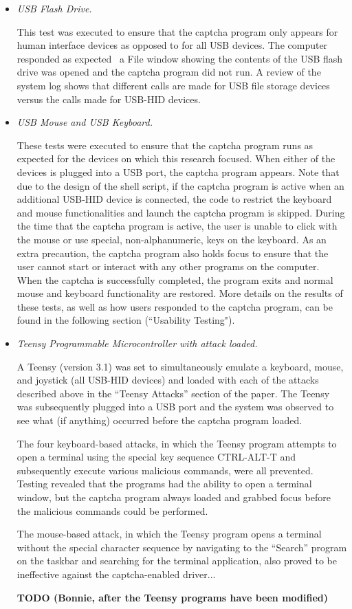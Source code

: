 \documentclass[pagenumbers]{ieee}
\begin{document}
\begin{itemize}
\item \textit{USB Flash Drive.}

This test was executed to ensure that the captcha program only appears for human interface devices as opposed to for all USB devices. The computer responded as expected \textemdash \ a File window showing the contents of the USB flash drive was opened and the captcha program did not run. A review of the system log shows that different calls are made for USB file storage devices versus the calls made for USB-HID devices.

\item \textit{USB Mouse and USB Keyboard.}

These tests were executed to ensure that the captcha program runs as expected for the devices on which this research focused. When either of the devices is plugged into a USB port, the captcha program appears. Note that due to the design of the shell script, if the captcha program is active when an additional USB-HID device is connected, the code to restrict the keyboard and mouse functionalities and launch the captcha program is skipped. During the time that the captcha program is active, the user is unable to click with the mouse or use special, non-alphanumeric, keys on the keyboard. As an extra precaution, the captcha program also holds focus to ensure that the user cannot start or interact with any other programs on the computer. When the captcha is successfully completed, the program exits and normal mouse and keyboard functionality are restored. More details on the results of these tests, as well as how users responded to the captcha program, can be found in the following section (``Usability Testing").

\item \textit{Teensy Programmable Microcontroller with attack loaded.}

A Teensy (version 3.1) was set to simultaneously emulate a keyboard, mouse, and joystick (all USB-HID devices) and loaded with each of the attacks described above in the ``Teensy Attacks'' section of the paper. The Teensy was subsequently plugged into a USB port and the system was observed to see what (if anything) occurred before the captcha program loaded. 

The four keyboard-based attacks, in which the Teensy program attempts to open a terminal using the special key sequence CTRL-ALT-T and subsequently execute various malicious commands, were all prevented. Testing revealed that the programs had the ability to open a terminal window, but the captcha program always loaded and grabbed focus before the malicious commands could be performed.

The mouse-based attack, in which the Teensy program opens a terminal without the special character sequence by navigating to the ``Search'' program on the taskbar and searching for the terminal application, also proved to be ineffective against the captcha-enabled driver...

\textbf{TODO (Bonnie, after the Teensy programs have been modified)}

\end{itemize}
\end{document}
